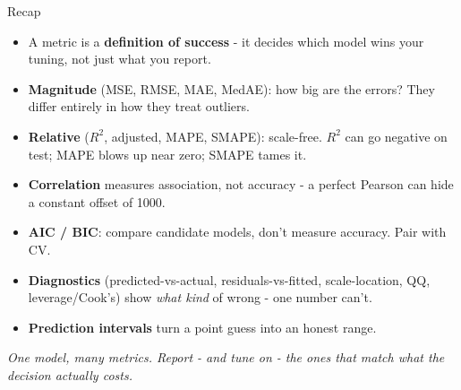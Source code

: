 \documentclass[aspectratio=169]{beamer}
\begin{document}
\begin{frame}{Recap}
  \begin{itemize}\small
    \item A metric is a \textbf{definition of success} - it decides which model wins your tuning, not just what you report.
    \item \textbf{Magnitude} (MSE, RMSE, MAE, MedAE): how big are the errors? They differ entirely in how they treat outliers.
    \item \textbf{Relative} ($R^2$, adjusted, MAPE, SMAPE): scale-free. $R^2$ can go negative on test; MAPE blows up near zero; SMAPE tames it.
    \item \textbf{Correlation} measures association, not accuracy - a perfect Pearson can hide a constant offset of 1000.
    \item \textbf{AIC / BIC}: compare candidate models, don't measure accuracy. Pair with CV.
    \item \textbf{Diagnostics} (predicted-vs-actual, residuals-vs-fitted, scale-location, QQ, leverage/Cook's) show \emph{what kind} of wrong - one number can't.
    \item \textbf{Prediction intervals} turn a point guess into an honest range.
  \end{itemize}
  \vfill
  \emph{One model, many metrics. Report - and tune on - the ones that match what the decision actually costs.}
\end{frame}
\end{document}
